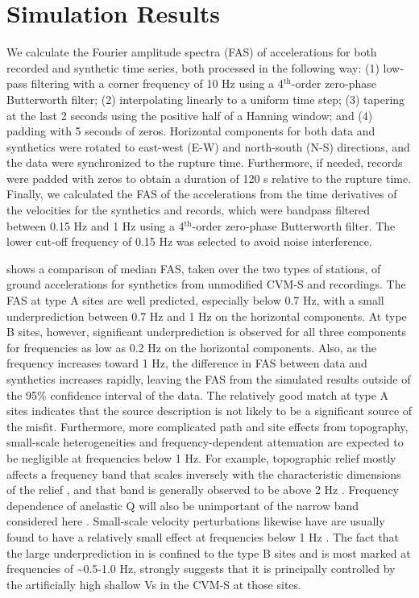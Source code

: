 \section{Simulation Results}
We calculate the Fourier amplitude spectra (FAS) of accelerations for both recorded and synthetic time series, both processed in the following way: (1) low-pass filtering with a corner frequency of 10 Hz using a 4$^{\text{th}}$-order zero-phase Butterworth filter; (2) interpolating linearly to a uniform time step; (3) tapering at the last 2 seconds using the positive half of a Hanning window; and (4) padding with 5 seconds of zeros. Horizontal components for both data and synthetics were rotated to east-west (E-W) and north-south (N-S) directions, and the data were synchronized to the rupture time. Furthermore, if needed, records were padded with zeros to obtain a duration of 120 s relative to the rupture time. Finally, we calculated the FAS of the accelerations from the time derivatives of the velocities for the synthetics and records, which were bandpass filtered between 0.15 Hz and 1 Hz using a 4$^{\text{th}}$-order zero-phase Butterworth filter. The lower cut-off frequency of 0.15 Hz was selected to avoid noise interference.

 shows a comparison of median FAS, taken over the two types of stations, of ground accelerations for synthetics from unmodified CVM-S and recordings. The FAS at type A sites are well predicted, especially below 0.7 Hz, with a small underprediction between 0.7 Hz and 1 Hz on the horizontal components. At type B sites, however, significant underprediction is observed for all three components for frequencies as low as 0.2 Hz on the horizontal components. Also, as the frequency increases toward 1 Hz, the difference in FAS between data and synthetics increases rapidly, leaving the FAS from the simulated results outside of the 95\% confidence interval of the data. The relatively good match at type A sites indicates that the source description is not likely to be a significant source of the misfit. Furthermore, more complicated path and site effects from topography, small-scale heterogeneities and frequency-dependent attenuation are expected to be negligible at frequencies below 1 Hz. For example, topographic relief mostly affects a frequency band that scales inversely with the characteristic dimensions of the relief , and that band is generally observed to be above 2 Hz . Frequency dependence of anelastic Q will also be unimportant of the narrow band considered here . Small-scale velocity perturbations likewise have are usually found to have a relatively small effect at frequencies below 1 Hz \citep{hartzellEffects3DRandom2010}. The fact that the large underprediction in  is confined to the type B sites and is most marked at frequencies of \textasciitilde 0.5-1.0 Hz, strongly suggests that it is principally controlled by the artificially high shallow Vs in the CVM-S at those sites.

